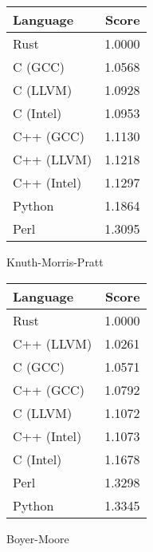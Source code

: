 \begin{subtable}{0.33\textwidth}
    \centering
    \begin{tabular}{|l|r|}
        \hline
        Language & Score \\
        \hline
        Rust & 1.0000 \\
        C (GCC) & 1.0568 \\
        C (LLVM) & 1.0928 \\
        C (Intel) & 1.0953 \\
        C++ (GCC) & 1.1130 \\
        C++ (LLVM) & 1.1218 \\
        C++ (Intel) & 1.1297 \\
        Python & 1.1864 \\
        Perl & 1.3095 \\
        \hline
    \end{tabular}
    \caption{Knuth-Morris-Pratt}
    \label{table:energy:kmp}
\end{subtable}%
\begin{subtable}{0.33\textwidth}
    \centering
    \begin{tabular}{|l|r|}
        \hline
        Language & Score \\
        \hline
        Rust & 1.0000 \\
        C++ (LLVM) & 1.0261 \\
        C (GCC) & 1.0571 \\
        C++ (GCC) & 1.0792 \\
        C (LLVM) & 1.1072 \\
        C++ (Intel) & 1.1073 \\
        C (Intel) & 1.1678 \\
        Perl & 1.3298 \\
        Python & 1.3345 \\
        \hline
    \end{tabular}
    \caption{Boyer-Moore}
    \label{table:energy:boyer_moore}
\end{subtable}%
